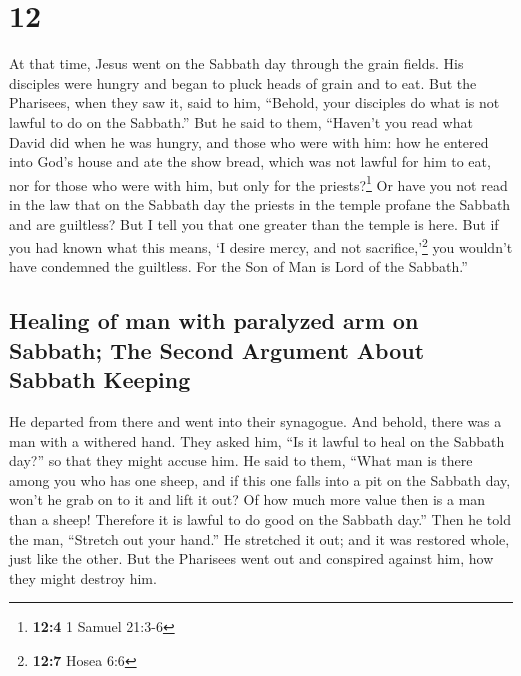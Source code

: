 \hypertarget{section-11}{%
\section{12}\label{section-11}}

 At that time, Jesus went on the Sabbath day through the
grain fields. His disciples were hungry and began to pluck heads of
grain and to eat.  But the Pharisees, when they saw it,
said to him, ``Behold, your disciples do what is not lawful to do on the
Sabbath.''  But he said to them, ``Haven't you read what
David did when he was hungry, and those who were with him:
 how he entered into God's house and ate the show bread,
which was not lawful for him to eat, nor for those who were with him,
but only for the priests?\footnote{\textbf{12:4} 1 Samuel 21:3-6}
 Or have you not read in the law that on the Sabbath day
the priests in the temple profane the Sabbath and are guiltless?
 But I tell you that one greater than the temple is here.
 But if you had known what this means, `I desire mercy,
and not sacrifice,'\footnote{\textbf{12:7} Hosea 6:6} you wouldn't have
condemned the guiltless.  For the Son of Man is Lord of
the Sabbath.''

\hypertarget{healing-of-man-with-paralyzed-arm-on-sabbath-the-second-argument-about-sabbath-keeping}{%
\subsection{Healing of man with paralyzed arm on Sabbath; The Second
Argument About Sabbath
Keeping}\label{healing-of-man-with-paralyzed-arm-on-sabbath-the-second-argument-about-sabbath-keeping}}

 He departed from there and went into their synagogue.
 And behold, there was a man with a withered hand. They
asked him, ``Is it lawful to heal on the Sabbath day?'' so that they
might accuse him.  He said to them, ``What man is there
among you who has one sheep, and if this one falls into a pit on the
Sabbath day, won't he grab on to it and lift it out?  Of
how much more value then is a man than a sheep! Therefore it is lawful
to do good on the Sabbath day.''  Then he told the man,
``Stretch out your hand.'' He stretched it out; and it was restored
whole, just like the other.  But the Pharisees went out
and conspired against him, how they might destroy him.


